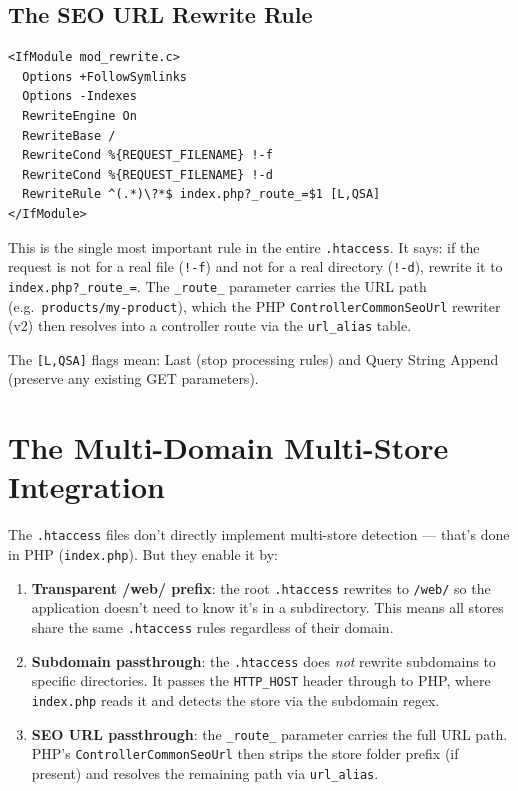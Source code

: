 \documentclass[11pt,a4paper]{article}
\begin{document}
\subsection{The SEO URL Rewrite Rule}

\begin{lstlisting}[caption={web/.htaccess --- the SEO URL rewrite rule.},label={lst:web-rewrite}]
<IfModule mod_rewrite.c>
  Options +FollowSymlinks
  Options -Indexes
  RewriteEngine On
  RewriteBase /
  RewriteCond %{REQUEST_FILENAME} !-f
  RewriteCond %{REQUEST_FILENAME} !-d
  RewriteRule ^(.*)\?*$ index.php?_route_=$1 [L,QSA]
</IfModule>
\end{lstlisting}

This is the single most important rule in the entire \texttt{.htaccess}.
It says: if the request is not for a real file (\texttt{!-f}) and not
for a real directory (\texttt{!-d}), rewrite it to
\texttt{index.php?\_route\_=}. The \texttt{\_route\_} parameter carries
the URL path (e.g.\ \texttt{products/my-product}), which the PHP
\texttt{ControllerCommonSeoUrl} rewriter (v2) then resolves into a
controller route via the \texttt{url\_alias} table.

The \texttt{[L,QSA]} flags mean: Last (stop processing rules) and
Query String Append (preserve any existing GET parameters).

\section{The Multi-Domain Multi-Store Integration}\label{sec:multi-domain}

The \texttt{.htaccess} files don't directly implement multi-store
detection --- that's done in PHP (\texttt{index.php}). But they enable
it by:

\begin{enumerate}[leftmargin=1.6em,itemsep=2pt]
  \item \textbf{Transparent /web/ prefix}: the root \texttt{.htaccess}
        rewrites to \texttt{/web/} so the application doesn't need to
        know it's in a subdirectory. This means all stores share the
        same \texttt{.htaccess} rules regardless of their domain.
  \item \textbf{Subdomain passthrough}: the \texttt{.htaccess} does
        \emph{not} rewrite subdomains to specific directories. It
        passes the \texttt{HTTP\_HOST} header through to PHP, where
        \texttt{index.php} reads it and detects the store via the
        subdomain regex.
  \item \textbf{SEO URL passthrough}: the \texttt{\_route\_} parameter
        carries the full URL path. PHP's \texttt{ControllerCommonSeoUrl}
        then strips the store folder prefix (if present) and resolves
        the remaining path via \texttt{url\_alias}.
\end{enumerate}
\end{document}
